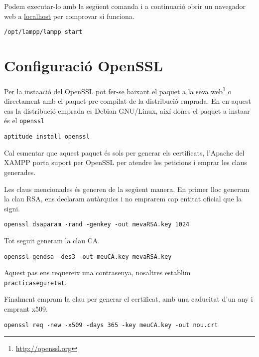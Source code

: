 \documentclass[a4paper,11pt]{scrartcl}
\begin{document}
Podem executar-lo amb la següent comanda i a continuació obrir un navegador
web a \href{http://localhost}{localhost} per comprovar si funciona.

\begin{verbatim}
/opt/lampp/lampp start
\end{verbatim}

\section{Configuració OpenSSL}
Per la insta\lgem ació del OpenSSL pot fer-se baixant el paquet a la seva
web\footnote{\url{http://openssl.org}} o directament amb el paquet pre-compilat
de la distribució emprada. En en aquest cas la distribució emprada es Debian 
GNU/Linux, així doncs el paquet a insta\lgem ar és el \texttt{openssl}

\begin{verbatim}
aptitude install openssl
\end{verbatim}

Cal esmentar que aquest paquet és sols per generar els certificats, l'Apache del XAMPP
porta suport per OpenSSL per atendre les peticions i emprar les claus generades.

Les claus mencionades és generen de la següent manera.
En primer lloc generam la clau RSA, ens declaram autàrquics i no emprarem cap entitat
oficial que la signi.

\begin{verbatim}
openssl dsaparam -rand -genkey -out mevaRSA.key 1024
\end{verbatim}

Tot seguit generam la clau CA.

\begin{verbatim}
openssl gendsa -des3 -out meuCA.key mevaRSA.key
\end{verbatim}

Aquest pas ens requereix una contrasenya, nosaltres establim \texttt{practicaseguretat}.

Finalment empram la clau per generar el certificat, amb una caducitat d'un any i emprant
x509.

\begin{verbatim}
openssl req -new -x509 -days 365 -key meuCA.key -out nou.crt
\end{verbatim}
\end{document}
